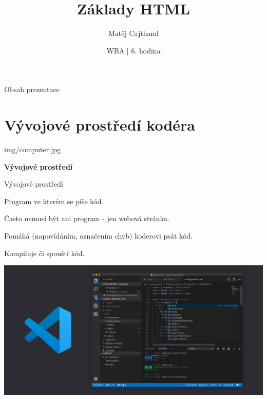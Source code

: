 \documentclass[aspectratio=169]{beamer}
\title{Základy HTML}
\date{WBA | 6. hodina}
\author[Cajthaml]{Matěj Cajthaml}
\begin{document}
\begin{frame}
\titlepage
\end{frame}

\begin{frame}{Obsah prezentace}
    \begin{cardTiny}
        \begin{minipage}{\textwidth}
            \vspace{1ex}
            \tableofcontents
        \end{minipage}
    \end{cardTiny}
\end{frame}



\section{Vývojové prostředí kodéra}

\begin{frameImg}[width]{img/computer.jpg}
    \vspace*{60mm}
    \begin{cardTiny}
        \vspace*{\fill}
        \begin{center}
            \textbf{Vývojové prostředí}
        \end{center}
    \end{cardTiny}
\end{frameImg}

\begin{frame}{Vývojové prostředí}
    \begin{cardTiny}
        \begin{flushleft}
            Program ve kterém se píše kód.

            Často nemusí být ani program - jen webová stránka.

            Pomáhá (napovídáním, označením chyb) koderovi psát kód.

            Kompiluje či spouští kód.
        \end{flushleft}
    \end{cardTiny}
\end{frame}

\begin{frame}
    \begin{center}
        \includegraphics[width=\textwidth]{img/vscode.png}
    \end{center}
\end{frame}
\end{document}

